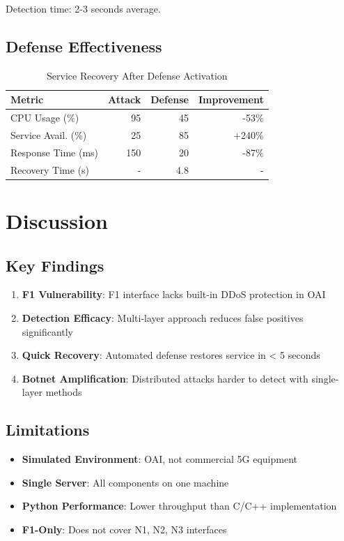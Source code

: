 \documentclass[conference]{IEEEtran}
\begin{document}
Detection time: 2-3 seconds average.

\subsection{Defense Effectiveness}

\begin{table}[h]
\centering
\caption{Service Recovery After Defense Activation}
\begin{tabular}{lrrr}
\toprule
\textbf{Metric} & \textbf{Attack} & \textbf{Defense} & \textbf{Improvement} \\
\midrule
CPU Usage (\%) & 95 & 45 & -53\% \\
Service Avail. (\%) & 25 & 85 & +240\% \\
Response Time (ms) & 150 & 20 & -87\% \\
Recovery Time (s) & - & 4.8 & - \\
\bottomrule
\end{tabular}
\end{table}

\section{Discussion}

\subsection{Key Findings}

\begin{enumerate}
    \item \textbf{F1 Vulnerability}: F1 interface lacks built-in DDoS protection in OAI
    \item \textbf{Detection Efficacy}: Multi-layer approach reduces false positives significantly
    \item \textbf{Quick Recovery}: Automated defense restores service in < 5 seconds
    \item \textbf{Botnet Amplification}: Distributed attacks harder to detect with single-layer methods
\end{enumerate}

\subsection{Limitations}

\begin{itemize}
    \item \textbf{Simulated Environment}: OAI, not commercial 5G equipment
    \item \textbf{Single Server}: All components on one machine
    \item \textbf{Python Performance}: Lower throughput than C/C++ implementation
    \item \textbf{F1-Only}: Does not cover N1, N2, N3 interfaces
\end{itemize}
\end{document}
